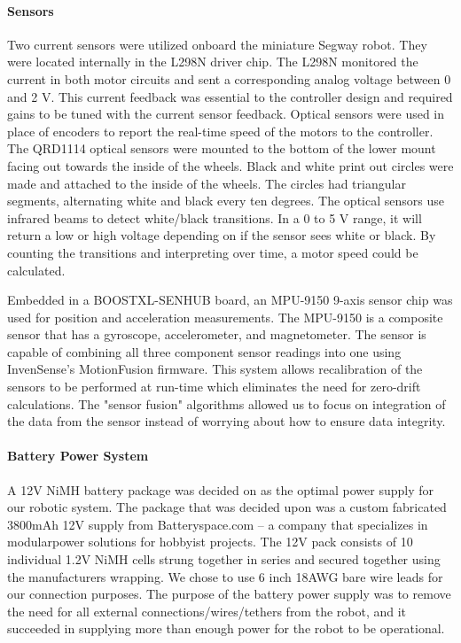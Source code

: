 \documentclass[11pt]{report}
\begin{document}
\begin{spacing}{1.5}
        \paragraph{Sensors}
        
        Two current sensors were utilized onboard the miniature Segway robot. They were located internally in the L298N driver chip. The L298N monitored the current in both motor circuits and sent a corresponding analog voltage between 0 and 2 V. This current feedback was essential to the controller design and required gains to be tuned with the current sensor feedback. Optical sensors were used in place of encoders to report the real-time speed of the motors to the controller. The QRD1114 optical sensors were mounted to the bottom of the lower mount facing out towards the inside of the wheels. Black and white print out circles were made and attached to the inside of the wheels. The circles had triangular segments, alternating white and black every ten degrees. The optical sensors use infrared beams to detect white/black transitions. In a 0 to 5 V range, it will return a low or high voltage depending on if the sensor sees white or black. By counting the transitions and interpreting over time, a motor speed could be calculated.
        
        Embedded in a BOOSTXL-SENHUB board, an MPU-9150 9-axis sensor chip was used for position and acceleration measurements.  The MPU-9150 is a composite sensor that has a gyroscope, accelerometer, and magnetometer.  The sensor is capable of combining all three component sensor readings into one using InvenSense's MotionFusion{\texttrademark} firmware.  This system allows recalibration of the sensors to be performed at run-time which eliminates the need for zero-drift calculations.  The "sensor fusion" algorithms allowed us to focus on integration of the data from the sensor instead of worrying about how to ensure data integrity.

        \paragraph{Battery Power System}
        
        A 12V NiMH battery package was decided on as the optimal power supply for our robotic system. The package that was decided upon was a custom fabricated 3800mAh 12V supply from Batteryspace.com – a company that specializes in modularpower solutions for hobbyist projects. The 12V pack consists of 10 individual 1.2V NiMH cells strung together in series and secured together using the manufacturers wrapping. We chose to use 6 inch 18AWG bare wire leads for our connection purposes. The purpose of the battery power supply was to remove the need for all external connections/wires/tethers from the robot, and it succeeded in supplying more than enough power for the robot to be operational.
        

\end{spacing}
\end{document}

